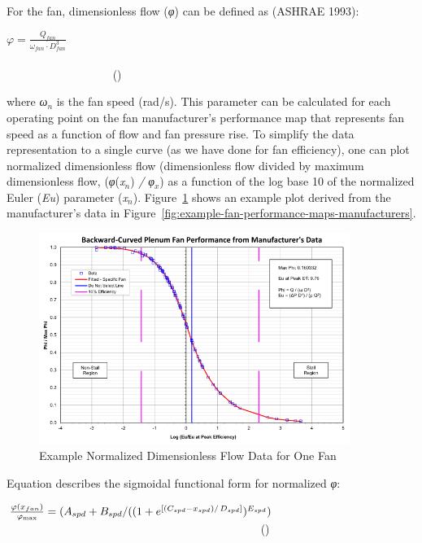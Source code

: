 For the fan, dimensionless flow (\emph{φ}) can be defined as (ASHRAE 1993):

\(\varphi = \frac{{{Q_{fan}}}}{{{\omega_{fan}} \cdot D_{fan}^3}}\) ~~~~~~~~~~~~~~~~~~~~~~~~~~~~~~~~~~~~~~~~~~~~~~~~~~~~~~~~~~~~~~~~~~~~~~~~~~~~~~~~~~~~~~~~~~ ()

where \emph{ω\(_{n}\)} is the fan speed (rad/s). This parameter can be calculated for each operating point on the fan manufacturer's performance map that represents fan speed as a function of flow and fan pressure rise. To simplify the data representation to a single curve (as we have done for fan efficiency), one can plot normalized dimensionless flow (dimensionless flow divided by maximum dimensionless flow, (\emph{φ}(\emph{x\(_{n}\)}) \emph{/} \emph{φ\(_{x}\)}) as a function of the log base 10 of the normalized Euler (\emph{Eu}) parameter (\emph{x\(_{n}\)}). Figure~\ref{fig:example-normalized-dimensionless-flow-data} shows an example plot derived from the manufacturer's data in Figure~\ref{fig:example-fan-performance-maps-manufacturers}.

\begin{figure}[hbtp] %
\centering
\includegraphics[width=0.9\textwidth, height=0.9\textheight, keepaspectratio=true]{media/image4901.svg.png}
\caption{Example Normalized Dimensionless Flow Data for One Fan \protect \label{fig:example-normalized-dimensionless-flow-data}}
\end{figure}

Equation describes the sigmoidal functional form for normalized \emph{φ}:

\(\frac{{\varphi \left( {{x_{fan}}} \right)}}{{{\varphi_{\max }}}} = ({A_{spd}} + {B_{spd}}/({(1 + {e^{\left[ {{{({C_{spd}} - {x_{spd}})} \mathord{\left/ {\vphantom {{({C_{spd}} - {x_{spd}})} {{D_{spd}}}}} \right. } {{D_{spd}}}}} \right]}})^{{E_{spd}}}})\) ~~~~~~~~~~~~~~~~~~~~~~~~~~~~~~~~~~~~~~~~~~~~ ()

